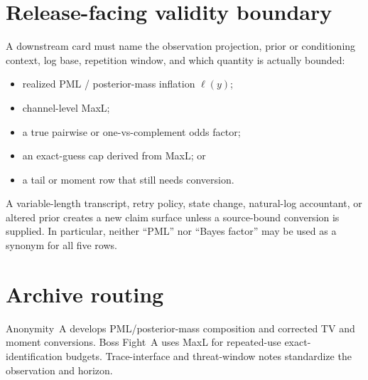 \documentclass[11pt]{article}
\begin{document}
\section{Release-facing validity boundary}
A downstream card must name the observation projection, prior or conditioning context, log base, repetition window, and which quantity is actually bounded:
\begin{itemize}[leftmargin=*]
\item realized PML / posterior-mass inflation $\ell(y)$;
\item channel-level MaxL;
\item a true pairwise or one-vs-complement odds factor;
\item an exact-guess cap derived from MaxL; or
\item a tail or moment row that still needs conversion.
\end{itemize}
A variable-length transcript, retry policy, state change, natural-log accountant, or altered prior creates a new claim surface unless a source-bound conversion is supplied.
In particular, neither ``PML'' nor ``Bayes factor'' may be used as a synonym for all five rows.

\section*{Archive routing}
Anonymity~A develops PML/posterior-mass composition and corrected TV and moment conversions.\cite{series:oddsinflation}
Boss Fight~A uses MaxL for repeated-use exact-identification budgets.\cite{series:bossfightA}
Trace-interface and threat-window notes standardize the observation and horizon.\cite{series:traceifaces,series:threatwindows}
\end{document}
